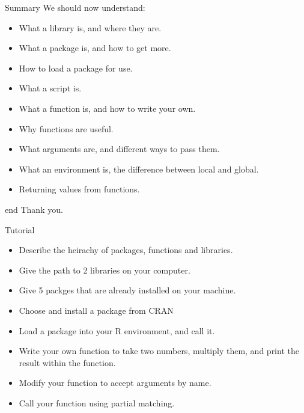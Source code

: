 \documentclass{beamer}\usepackage[]{graphicx}\usepackage[]{color}
\begin{document}
\begin{frame}[fragile]{Summary}
We should now understand:
\begin{itemize}
\item What a library is, and where they are.
\item What a package is, and how to get more.
\item How to load a package for use.
\item What a script is.
\item What a function is, and how to write your own.
\item Why functions are useful.
\item What arguments are, and different ways to pass them.
\item What an environment is, the difference between local and global.
\item Returning values from functions.
\end{itemize}
\end{frame}

\begin{frame}[fragile]{end}
Thank you.
\end{frame}

\begin{frame}[fragile]{Tutorial}



\begin{itemize}
\item Describe the heirachy of packages, functions and libraries.
\item Give the path to 2 libraries on your computer.
\item Give 5 packges that are already installed on your machine.
\item Choose and install a package from CRAN
\item Load a package into your R environment, and call it.
\item Write your own function to take two numbers, multiply them, and print the result within the function.
\item Modify your function to accept arguments by name.
\item Call your function using partial matching.
\end{itemize}
\end{frame}
\end{document}
